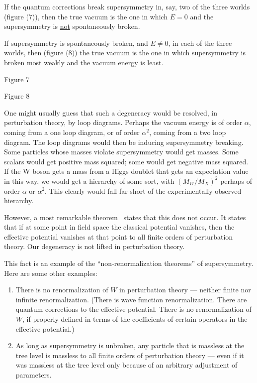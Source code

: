 \documentclass[11pt,a4paper]{article}
\begin{document}
If the quantum corrections break supersymmetry in, say, two of
the three worlds (figure (7)), then the true vacuum is the one in which
$E = 0$ and the supersymmetry is \underline{not}
spontaneously broken.

If supersymmetry is spontaneously broken, and $E \neq 0$, in each
of the three worlds, then (figure (8)) the true vacuum is the one in
which supersymmetry is broken most weakly and the vacuum energy is
least.

\begin{center}
\begin{minipage}{0.42\textwidth}
\centering

\par\smallskip
Figure 7
\end{minipage}\hfill
\begin{minipage}{0.42\textwidth}
\centering

\par\smallskip
Figure 8
\end{minipage}
\end{center}

One might usually guess that such a degeneracy would be resolved,
in perturbation theory, by loop diagrams. Perhaps the vacuum energy
is of order $\alpha$, coming from a one loop diagram, or of order $\alpha^2$, coming
from a two loop diagram. The loop diagrams would then be inducing
supersymmetry breaking. Some particles whose masses violate supersymmetry would get masses. Some scalars would get positive mass
squared; some would get negative mass squared. If the W boson gets
a mass from a Higgs doublet that gets an expectation value in this
way, we would get a hierarchy of some sort, with $(M_W/M_X)^2$ perhaps of
order $\alpha$ or $\alpha^2$. This clearly would fall far short of the experimentally
observed hierarchy.

However, a most remarkable theorem~\cite{ref10} states that this does not
occur. It states that if at some point in field space the classical
potential vanishes, then the effective potential vanishes at that
point to all finite orders of perturbation theory. Our degeneracy
is not lifted in perturbation theory.

This fact is an example of the ``non-renormalization theorems''
of supersymmetry. Here are some other examples:
\begin{enumerate}
\item[(1)]
There is no renormalization of $W$ in perturbation theory ---
neither finite nor infinite renormalization. (There is wave function
renormalization. There are quantum corrections to the effective
potential. There is no renormalization of $W$, if properly defined in
terms of the coefficients of certain operators in the effective
potential.)
\item[(2)]
As long as supersymmetry is unbroken, any particle that is
massless at the tree level is massless to all finite orders of perturbation
theory --- even if it was massless at the tree level only
because of an arbitrary adjustment of parameters.
\end{enumerate}
\end{document}
